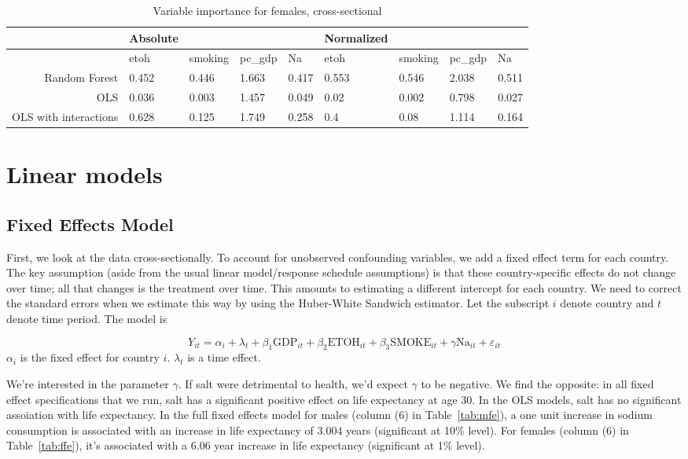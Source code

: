 \documentclass[11pt]{article}\usepackage[]{graphicx}\usepackage[]{color}
\newcommand{\eps}{\varepsilon}
\begin{document}
\begin{table}[ht]
\centering
\begin{tabular}{r|llll|llll}
   \hline
 & Absolute &  &  &  & Normalized &  &  &  \\ 
   \hline
   & etoh & smoking & pc\_gdp & Na & etoh & smoking & pc\_gdp & Na \\ 
   \hline
Random Forest & 0.452 & 0.446 & 1.663 & 0.417 & 0.553 & 0.546 & 2.038 & 0.511 \\ 
  OLS & 0.036 & 0.003 & 1.457 & 0.049 & 0.02 & 0.002 & 0.798 & 0.027 \\ 
  OLS with interactions & 0.628 & 0.125 & 1.749 & 0.258 & 0.4 & 0.08 & 1.114 & 0.164 \\ 
   \hline
\end{tabular}
\caption{Variable importance for females, cross-sectional} 
\end{table}


\newpage

\section{Linear models}


\subsection{Fixed Effects Model}
First, we look at the data cross-sectionally.
To account for unobserved confounding variables, we add a fixed effect term for each country.
The key assumption (aside from the usual linear model/response schedule assumptions) is that these country-specific effects do not change over time; all that changes is the treatment over time.
This amounts to estimating a different intercept for each country.
We need to correct the standard errors when we estimate this way by using the Huber-White Sandwich estimator.
Let the subscript $i$ denote country and $t$ denote time period.
The model is

$$Y_{it} = \alpha_i + \lambda_t + \beta_1\text{GDP}_{it} +  \beta_2\text{ETOH}_{it} +  \beta_3\text{SMOKE}_{it} + \gamma\text{Na}_{it} + \eps_{it}$$
$\alpha_i$ is the fixed effect for country $i$.
$\lambda_t$ is a time effect.

We're interested in the parameter $\gamma$.
If salt were detrimental to health, we'd expect $\gamma$ to be negative.
We find the opposite: in all fixed effect specifications that we run, salt has a significant positive effect on life expectancy at age 30.
In the OLS models, salt has no significant assoiation with life expectancy.
In the full fixed effects model for males (column (6) in Table~\ref{tab:mfe}), a one unit increase in sodium consumption is associated with an increase in life expectancy of $3.004$ years (significant at 10\% level).
For females (column (6) in Table~\ref{tab:ffe}), it's associated with a $6.06$ year increase in life expectancy (significant at 1\% level).
\end{document}
